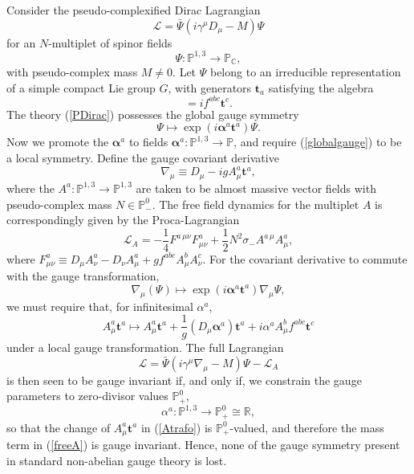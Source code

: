 \documentclass[a4paper,aps,prd,showkeys,showpacs,superscriptaddress,preprint]{revtex4}
\newcommand{\pc}{\mathbb{P}}
\newcommand{\reals}{\mathbb{R}}
\begin{document}
Consider the pseudo-complexified Dirac Lagrangian
\begin{equation}\label{PDirac}
  \mathcal{L} = \bar\Psi(i \gamma^\mu D_\mu - M) \Psi
\end{equation}
for an $N$-multiplet of spinor fields
\begin{equation}
  \Psi: \pc^{1,3} \longrightarrow \pc_\mathbb{C},
\end{equation}
with pseudo-complex mass $M\neq 0$. Let $\Psi$ belong to an
irreducible representation of a simple compact Lie group $G$, with
generators $\mathbf{t}_a$ satisfying the algebra
\begin{equation}
  [\mathbf{t}^a,\mathbf{t}^b] = i f^{abc} \mathbf{t}^c.
\end{equation}
The theory (\ref{PDirac}) possesses the global gauge symmetry
\begin{equation}\label{globalgauge}
  \Psi \mapsto \exp(i \mathbf{\alpha}^a \mathbf{t}^a) \Psi.
\end{equation}
Now we promote the $\mathbf{\alpha}^a$ to fields $\mathbf{\alpha}^a: \pc^{1,3} \longrightarrow \pc$,
and require (\ref{globalgauge}) to be a local symmetry. Define the gauge covariant derivative
\begin{equation}
  \nabla_\mu \equiv D_\mu - i g A^a_\mu \mathbf{t}^a,
\end{equation} 
where the $A^a: \pc^{1,3} \longrightarrow \pc^{1,3}$ are
taken to be almost massive
vector fields with pseudo-complex mass $N \in \pc^0_-$. The free field
dynamics for the multiplet $A$ is correspondingly given by the Proca-Lagrangian
\begin{equation}\label{freeA}
  \mathcal{L}_A = - \frac{1}{4} F^{a\,\mu\nu}
  F^a_{\mu\nu} + \frac{1}{2}
  N^2 \sigma_- A^{a\,\mu} A^a_\mu,
\end{equation} 
where $F^a_{\mu\nu} \equiv D_\mu A^a_\nu - D_\nu A^a_\mu + g
f^{abc} A^b_\mu A^c_\nu $.
For the covariant derivative to commute with the gauge transformation,
\begin{equation}
  \nabla_\mu(\Psi) \mapsto \exp(i \mathbf{\alpha}^a \mathbf{t}^a) \nabla_\mu \Psi, 
\end{equation} 
we must require that, for infinitesimal $\alpha^a$, 
\begin{equation}\label{Atrafo}
  A^a_\mu \mathbf{t}^a \mapsto A^a_\mu \mathbf{t}^a + \frac{1}{g}
  \left(D_\mu \mathbf{\alpha}^a\right) \mathbf{t}^a + i \alpha^a A^b_\mu
  f^{abc} \mathbf{t}^c 
\end{equation}
under a local gauge transformation. The full Lagrangian
\begin{equation}
  \mathcal{L} = \bar\Psi(i \gamma^\mu \nabla_\mu - M) \Psi - \mathcal{L}_A 
\end{equation}
is then seen to be gauge invariant if, and only if, we constrain the gauge
parameters to zero-divisor values $\pc^0_+$,
\begin{equation}
  \alpha^a: \pc^{1,3} \longrightarrow \pc^0_+ \cong \reals,
\end{equation} 
so that the change of $A^a_\mu \mathbf{t}^a$ in (\ref{Atrafo}) is $\pc^0_+$-valued, and therefore the mass term in (\ref{freeA}) is gauge
invariant. Hence, none of the gauge symmetry present in standard
non-abelian gauge theory is lost. 
\end{document}

